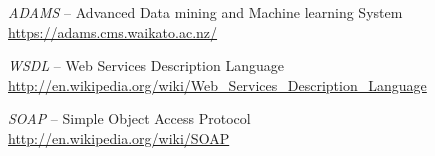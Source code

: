 %

\begin{thebibliography}{999}

		\textit{ADAMS} -- Advanced Data mining and Machine learning System \\
		\url{https://adams.cms.waikato.ac.nz/}{}
		
		\textit{WSDL} -- Web Services Description Language \\
		{\scriptsize \url{http://en.wikipedia.org/wiki/Web_Services_Description_Language}{}}
		
		\textit{SOAP} -- Simple Object Access Protocol \\
		\url{http://en.wikipedia.org/wiki/SOAP}{}

\end{thebibliography}
